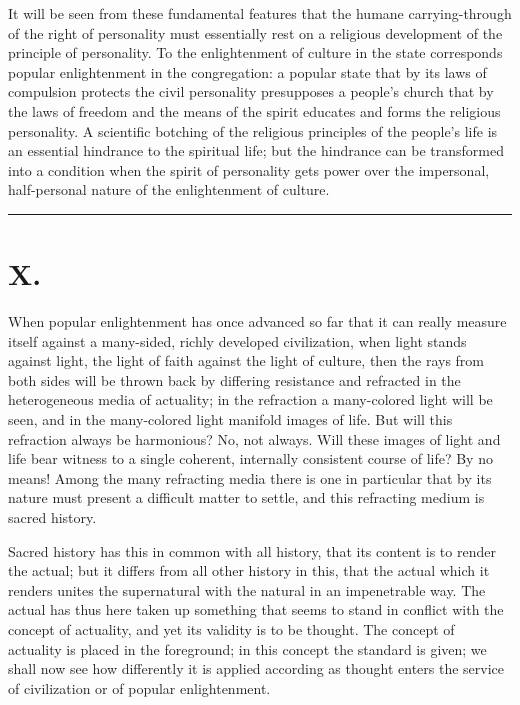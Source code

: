 \documentclass[12pt]{book}
\newcommand{\opage}[1]{\marginnote{\footnotesize\textit{[#1]}}}
\begin{document}
It will be seen from these fundamental features that the humane
carrying-through of the right of personality must essentially rest on a
religious development of the principle of personality. To the
enlightenment of culture in the state corresponds popular enlightenment
in the congregation: a popular state that by its laws of compulsion
protects the civil personality presupposes a people's church that by the
laws of freedom and the means of the spirit educates and forms the
religious personality. A scientific botching of the religious principles
of the people's life is an essential hindrance to the spiritual life;
but the hindrance can be transformed into a condition when the spirit of
personality gets power over the impersonal, half-personal nature of the
enlightenment of culture.

\begin{center}\rule{3cm}{0.4pt}\end{center}

\chapter*{X.}
\label{ch:x}
\opage{154}\setcounter{footnote}{0}%
When popular enlightenment has once advanced so far that it can really
measure itself against a many-sided, richly developed civilization, when
light stands against light, the light of faith against the light of
culture, then the rays from both sides will be thrown back by differing
resistance and refracted in the heterogeneous media of actuality; in the
refraction a many-colored light will be seen, and in the many-colored
light manifold images of life. But will this refraction always be
harmonious? No, not always. Will these images of light and life bear
witness to a single coherent, internally consistent course of life? By
no means! Among the many refracting media there is one in particular
that by its nature must present a difficult matter to settle, and this
refracting medium is sacred history.

Sacred history has this in common with all history, that its content
is to render the actual; but it differs from all other history in this,
that the actual which it renders unites the supernatural with the
natural in an impenetrable way. The actual has thus here taken up
something that seems to stand in conflict with the concept of
actuality, and yet its validity is to be thought. The concept of
actuality is placed in the foreground; in this concept the standard is
given; we shall now see
\opage{155}\setcounter{footnote}{0}%
how differently it is applied according as thought enters the service
of civilization or of popular enlightenment.
\end{document}

